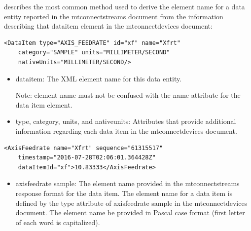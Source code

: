 \documentclass{mtconnect}	%
\begin{document}
 describes the most common method used to derive the \gls{element name} for a \gls{data entity} reported in the \gls{mtconnectstreams} document from the information describing that \gls{dataitem} element in the \gls{mtconnectdevices} document:


\begin{lstlisting}[firstnumber=1,escapechar=|,%
    caption={DataItem Represented in MTConnectDevices Document},label={lst:example-of-dataitem-in-mtconnectdevices}]
<DataItem type="AXIS_FEEDRATE" id="xf" name="Xfrt"
    category="SAMPLE" units="MILLIMETER/SECOND"
    nativeUnits="MILLIMETER/SECOND/>
\end{lstlisting}

\begin{itemize}
\item \gls{dataitem}:  The XML \gls{element name} for this \gls{data entity}.  

\begin{note}
Note:  \gls{element name} must not be confused with the name attribute for the data item element.
\end{note}

\item \gls{type}, \gls{category}, \gls{units}, and \gls{nativeunits}:  Attributes that provide additional information regarding each data item in the \gls{mtconnectdevices} document.  
\end{itemize}


\begin{lstlisting}[firstnumber=1,escapechar=|,%
    caption={Response Format reported in the MTConnectStreams Document},label={lst:example-of-dataitem-in-mtconnectstreams}]
<AxisFeedrate name="Xfrt" sequence="61315517"  
    timestamp="2016-07-28T02:06:01.364428Z" 
    dataItemId="xf">10.83333</AxisFeedrate>
\end{lstlisting}

\begin{itemize}
\item \gls{axisfeedrate sample}:  The \gls{element name} provided in the \gls{mtconnectstreams} response format for the data item. The \gls{element name} for a data item is defined by the \gls{type} attribute of \gls{axisfeedrate sample} in the \gls{mtconnectdevices} document.  The \gls{element name} \must be provided in Pascal case format (first letter of each word is capitalized).  
\end{itemize}
\end{document}
